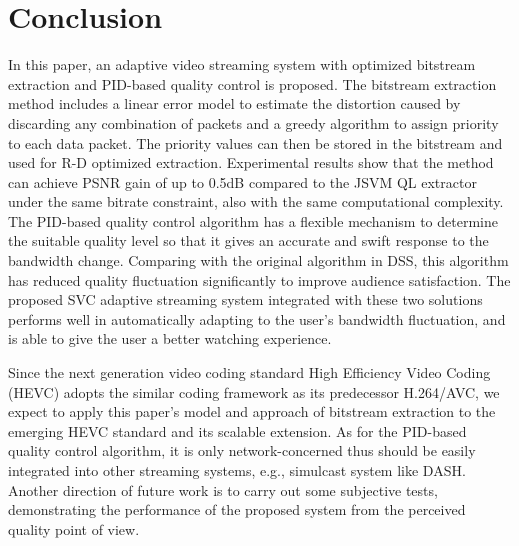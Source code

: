 \documentclass[journal]{IEEEtran}
\begin{document}
\section{Conclusion}
\label{sec:conclusion}

In this paper, an adaptive video streaming system with optimized bitstream extraction and PID-based quality control is proposed. The bitstream extraction method includes a linear error model to estimate the distortion caused by discarding any combination of packets and a greedy algorithm to assign priority to each data packet. The priority values can then be stored in the bitstream and used for R-D optimized extraction. Experimental results show that the method can achieve PSNR gain of up to 0.5dB compared to the JSVM QL extractor under the same bitrate constraint, also with the same computational complexity. The PID-based quality control algorithm has a flexible mechanism to determine the suitable quality level so that it gives an accurate and swift response to the bandwidth change. Comparing with the original algorithm in DSS, this algorithm has reduced quality fluctuation significantly to improve audience satisfaction. The proposed SVC adaptive streaming system integrated with these two solutions performs well in automatically adapting to the user's bandwidth fluctuation, and is able to give the user a better watching experience.

Since the next generation video coding standard High Efficiency Video Coding (HEVC) \cite{HEVC} adopts the similar coding framework as its predecessor H.264/AVC, we expect to apply this paper's model and approach of bitstream extraction to the emerging HEVC standard and its scalable extension. As for the PID-based quality control algorithm, it is only network-concerned thus should be easily integrated into other streaming systems, e.g., simulcast system like DASH. Another direction of future work is to carry out some subjective tests, demonstrating the performance of the proposed system from the perceived quality point of view.

\ifCLASSOPTIONcaptionsoff
  \newpage
\fi



\end{document}

